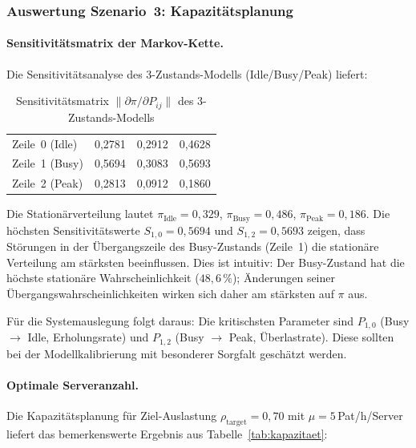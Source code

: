 ﻿\documentclass[a4paper,12pt]{scrreprt}
\theoremstyle{definition}
\begin{document}
\subsubsection{Auswertung Szenario~3: Kapazitätsplanung}

\paragraph{Sensitivitätsmatrix der Markov-Kette.}
Die Sensitivitätsanalyse des 3-Zustands-Modells (Idle/Busy/Peak) liefert:

\begin{table}[H]
	\centering
	\begin{tabular}{@{}lrrr@{}}
		\toprule
		& \boldmath{$\partial\pi / \partial P_{i,0}$} &
		\boldmath{$\partial\pi / \partial P_{i,1}$} &
		\boldmath{$\partial\pi / \partial P_{i,2}$} \\
		\midrule
		Zeile~0 (Idle) & 0{,}2781 & 0{,}2912 & 0{,}4628 \\
		Zeile~1 (Busy) & 0{,}5694 & 0{,}3083 & 0{,}5693 \\
		Zeile~2 (Peak) & 0{,}2813 & 0{,}0912 & 0{,}1860 \\
		\bottomrule
	\end{tabular}
	\caption{Sensitivitätsmatrix $\|\partial\pi/\partial P_{ij}\|$ des 3-Zustands-Modells}
	\label{tab:sensitivitaet}
\end{table}

Die Stationärverteilung lautet $\pi_\text{Idle} = 0{,}329$,
$\pi_\text{Busy} = 0{,}486$, $\pi_\text{Peak} = 0{,}186$.
Die höchsten Sensitivitätswerte $S_{1,0} = 0{,}5694$ und
$S_{1,2} = 0{,}5693$ zeigen, dass Störungen in der Übergangszeile
des Busy-Zustands (Zeile~1) die stationäre Verteilung am stärksten
beeinflussen. Dies ist intuitiv: Der Busy-Zustand hat die höchste
stationäre Wahrscheinlichkeit ($48{,}6\,\%$); Änderungen seiner
Übergangswahrscheinlichkeiten wirken sich daher am stärksten auf $\pi$ aus.

Für die Systemauslegung folgt daraus: Die kritischsten Parameter sind
$P_{1,0}$ (Busy $\to$ Idle, Erholungsrate) und $P_{1,2}$
(Busy $\to$ Peak, Überlastrate). Diese sollten bei der Modellkalibrierung
mit besonderer Sorgfalt geschätzt werden.

\paragraph{Optimale Serveranzahl.}
Die Kapazitätsplanung für Ziel-Auslastung $\rho_\text{target} = 0{,}70$
mit $\mu = 5$\,Pat/h/Server liefert das bemerkenswerte Ergebnis aus
Tabelle~\ref{tab:kapazitaet}:
\end{document}

